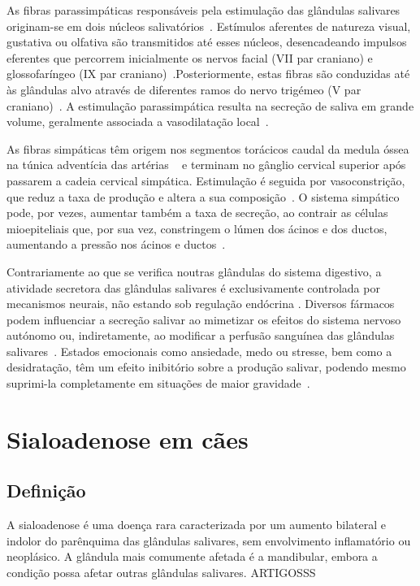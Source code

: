 As fibras parassimpáticas responsáveis pela estimulação das glândulas salivares originam-se em dois núcleos salivatórios~\cite{Poirier2018,Bae2024}. Estímulos aferentes de natureza visual, gustativa ou olfativa são transmitidos até esses núcleos, desencadeando impulsos eferentes que percorrem inicialmente os nervos facial (VII par craniano) e glossofaríngeo (IX par craniano)~\cite{Singh2017}.Posteriormente, estas fibras são conduzidas até às glândulas alvo através de diferentes ramos do nervo trigémeo (V par craniano)~\cite{Singh2017}. A estimulação parassimpática resulta na secreção de saliva em grande volume, geralmente associada a vasodilatação local~\cite{Singh2017}. 


As fibras simpáticas têm origem nos segmentos torácicos caudal da medula óssea na túnica adventícia das artérias ~\cite{Poirier2018,Bae2024} e terminam no gânglio cervical superior após passarem a cadeia cervical simpática. Estimulação é seguida por vasoconstrição, que reduz a taxa de produção e altera a sua composição~\cite{Poirier2018,Singh2017,Bae2024}. O sistema simpático pode, por vezes, aumentar também a taxa de secreção, ao contrair as células mioepiteliais que, por sua vez, constringem o lúmen dos ácinos e dos ductos, aumentando a pressão nos ácinos e ductos~\cite{lobprise_oral_2019}. 


Contrariamente ao que se verifica noutras glândulas do sistema digestivo, a atividade secretora das glândulas salivares é exclusivamente controlada por mecanismos neurais, não estando sob regulação endócrina \cite{Cunningham}. Diversos fármacos podem influenciar a secreção salivar ao mimetizar os efeitos do sistema nervoso autónomo ou, indiretamente, ao modificar a perfusão sanguínea das glândulas salivares~\cite{Cattai2016}. Estados emocionais como ansiedade, medo ou stresse, bem como a desidratação, têm um efeito inibitório sobre a produção salivar, podendo mesmo suprimi-la completamente em situações de maior gravidade~\cite{Poirier2018,Bae2024,Singh2017}. 


\section{Sialoadenose em cães}

\subsection{Definição}

A sialoadenose é uma doença rara caracterizada por um aumento bilateral e indolor do parênquima das glândulas salivares, sem envolvimento inflamatório ou neoplásico. A glândula mais comumente afetada é a mandibular, embora a condição possa afetar outras glândulas salivares. ARTIGOSSS


